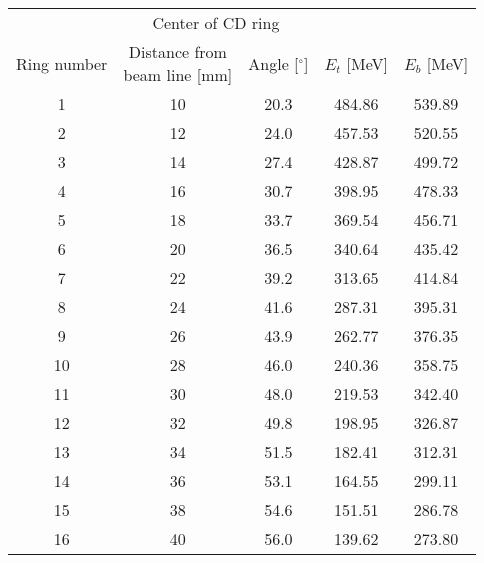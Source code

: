 \begin{tabular}{ccccc}
\hline
            & \multicolumn{2}{c}{Center of CD ring}                            &             &             \\
Ring number & \shortstack{Distance from \\ beam line [mm]}  & Angle [$^\circ$] & $E_t$ [MeV] & $E_b$ [MeV] \\
\hline
1           & 10                                            & 20.3             & 484.86      & 539.89      \\
2           & 12                                            & 24.0             & 457.53      & 520.55      \\
3           & 14                                            & 27.4             & 428.87      & 499.72      \\
4           & 16                                            & 30.7             & 398.95      & 478.33      \\
5           & 18                                            & 33.7             & 369.54      & 456.71      \\
6           & 20                                            & 36.5             & 340.64      & 435.42      \\
7           & 22                                            & 39.2             & 313.65      & 414.84      \\
8           & 24                                            & 41.6             & 287.31      & 395.31      \\
9           & 26                                            & 43.9             & 262.77      & 376.35      \\
10          & 28                                            & 46.0             & 240.36      & 358.75      \\
11          & 30                                            & 48.0             & 219.53      & 342.40      \\
12          & 32                                            & 49.8             & 198.95      & 326.87      \\
13          & 34                                            & 51.5             & 182.41      & 312.31      \\
14          & 36                                            & 53.1             & 164.55      & 299.11      \\
15          & 38                                            & 54.6             & 151.51      & 286.78      \\
16          & 40                                            & 56.0             & 139.62      & 273.80      \\
\hline
\end{tabular}